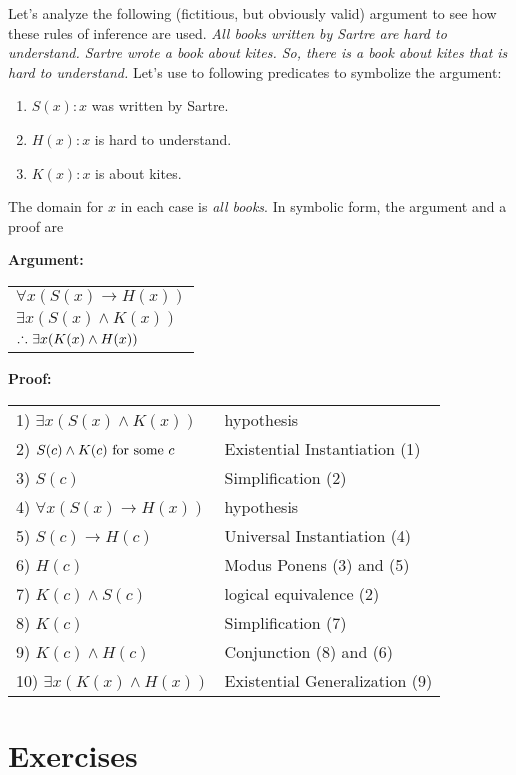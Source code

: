 \begin{exmp}
 Let's analyze the following (fictitious, but obviously valid) argument 
to see how these rules of inference are used. {\itshape All books written by
Sartre are hard to understand. Sartre wrote a book about kites. So, there
is a book about kites that is hard to understand.} Let's use to following
predicates to symbolize the argument:
\begin{enumerate}
\item $S(x) :  x $ was written by Sartre.
\item $H(x) : x $ is hard to understand.
\item $K(x) : x $ is about kites.
\end{enumerate}
The domain for $x$ in each case is {\itshape all books}.
In symbolic form, the argument and a proof are



\textbf{Argument:}
\begin{tabular}[t]{l}
$\forall{x}(S(x)\rightarrow H(x))$ \\
$\exists{x}(S(x) \land K(x))$ \\
\hline
$\thus \exists{x}(K(x)\land H(x))$
\end{tabular}

\medskip

\textbf{Proof:}
\begin{tabular}[t]{l l}
1) $\exists{x}(S(x) \land K(x))$& hypothesis \\
2) $S(c)\land K(c) \hbox{ for some } c $& Existential Instantiation (1) \\ 
3) $S(c)$& Simplification (2) \\ 
4) $\forall{x}(S(x) \to H(x))$& hypothesis \\ 
5) $S(c)\to H(c)$& Universal Instantiation (4) \\ 
6) $H(c)$& Modus Ponens (3) and (5) \\ 
7) $K(c) \land S(c)$& logical equivalence (2) \\ 
8) $K(c)$& Simplification (7) \\ 
9) $K(c)\land H(c)$& Conjunction (8) and (6) \\ 
10) $\exists{x}(K(x)\land H(x))$& Existential Generalization (9)
\end{tabular}
\end{exmp}

\clearpage




\section{Exercises}

